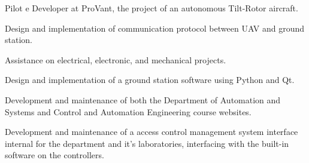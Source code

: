 \documentclass[A4]{deedy-resume} %
\begin{document}
\begin{minipage}[t]{0.66\textwidth}
\sectionspace %

\vspace{\topsep}
\begin{tightitemize}
 \item Pilot e Developer at ProVant, the project of an autonomous  Tilt-Rotor aircraft.
 \item Design and implementation of communication protocol between UAV and ground station.
 \item Assistance on electrical, electronic, and mechanical projects.
 \item Design and implementation of a ground station software using  Python and Qt.

\end{tightitemize}

\sectionspace %

\begin{tightitemize}
 \item Development and maintenance of both the Department of Automation and Systems and Control and Automation Engineering course websites.
\end{tightitemize}

\sectionspace %

\begin{tightitemize}
 \item Development and maintenance of a access control management system interface internal for the department and it's laboratories, interfacing with the built-in software on the controllers.
\end{tightitemize}

\sectionspace %







\end{minipage}
\end{document}
